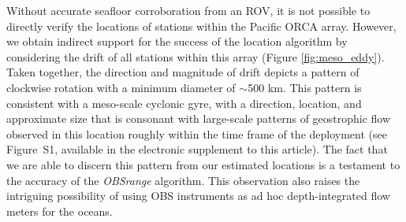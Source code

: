 Without accurate seafloor corroboration from an ROV, it is not possible to directly verify the locations of stations within the Pacific ORCA array. However, we  obtain indirect support for the success of the location algorithm by considering the drift of all stations within this array (Figure \ref{fig:meso_eddy}). Taken together, the direction and magnitude of drift depicts a pattern of clockwise rotation with a minimum diameter of $\sim$500 km. This pattern is consistent with a meso-scale cyclonic gyre, with a direction, location, and approximate size that is consonant with large-scale patterns of geostrophic flow observed in this location roughly within the time frame of the deployment (see Figure~S1, available in the electronic supplement to this article). The fact that we are able to discern this pattern from our estimated locations is a testament to the accuracy of the \textit{OBSrange} algorithm. This observation also raises the intriguing possibility of using OBS instruments as ad hoc depth-integrated flow meters for the oceans. 